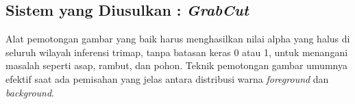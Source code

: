 \subsection{{Sistem yang Diusulkan : \emph{GrabCut}}}




Alat pemotongan gambar yang baik harus menghasilkan nilai alpha yang halus di seluruh 
wilayah inferensi trimap, tanpa batasan keras 0 atau 1, untuk menangani masalah seperti asap, 
rambut, dan pohon. Teknik pemotongan gambar umumnya efektif saat ada pemisahan 
yang jelas antara distribusi warna \emph{foreground} dan \emph{background}.

